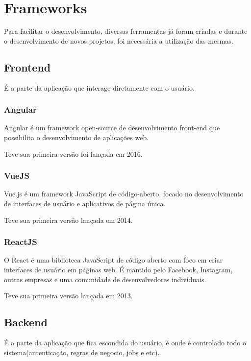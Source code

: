 \section{Frameworks}

Para facilitar o desenvolvimento, diversas ferramentas já foram criadas e durante o desenvolvimento de novos projetos, foi necessária a utilização das mesmas.

\subsection{Frontend}

É a parte da aplicação que interage diretamente com o usuário.

\subsubsection{Angular}

Angular é um framework open-source de desenvolvimento front-end que possibilita o desenvolvimento de aplicações web.

Teve sua primeira versão foi lançada em 2016.

\subsubsection{VueJS}

Vue.js é um framework JavaScript de código-aberto, focado no desenvolvimento de interfaces de usuário e aplicativos de página única.

Teve sua primeira versão lançada em 2014.

\subsubsection{ReactJS}

O React é uma biblioteca JavaScript de código aberto com foco em criar interfaces de usuário em páginas web. É mantido pelo Facebook, Instagram, outras empresas e uma comunidade de desenvolvedores individuais. 

Teve sua primeira versão lançada em 2013.

\subsection{Backend}

É a parte da aplicação que fica escondida do usuário, é onde é controlado todo o sistema(autenticação, regras de negocio, jobs e etc).

